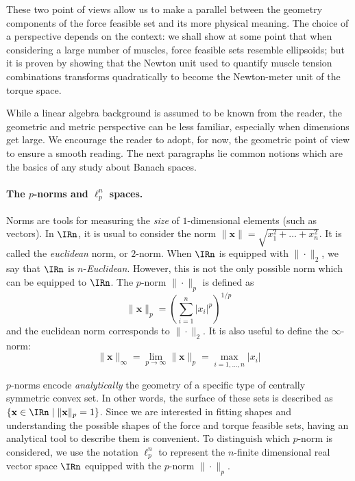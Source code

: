 These two point of views allow us to make a parallel between the geometry components of the force feasible set and its more physical meaning. The choice of a perspective depends on the context: we shall show at some point that when considering a large number of muscles, force feasible sets resemble ellipsoids; but it is proven by showing that the Newton unit used to quantify muscle tension combinations transforms quadratically to become the Newton-meter unit of the torque space.

While a linear algebra background is assumed to be known from the reader, the geometric and metric perspective can be less familiar, especially when dimensions get large. We encourage the reader to adopt, for now, the geometric point of view to ensure a smooth reading. The next paragraphs lie common notions which are the basics of any study about Banach spaces.

\paragraph*{The $p$-norms and $\ell_p^n$ spaces.} Norms are tools for measuring the \emph{size} of $1$-dimensional elements (such as vectors). In $\IRn$, it is usual to consider the norm $\|\mathbf{x}\| = \sqrt{x_1^2 + \dots + x_n^2}$. It is called the \emph{euclidean} norm, or $2$-norm. When $\IRn$ is equipped with $\|\cdot \|_2$, we say that $\IRn$ is $n$-\emph{Euclidean}. However, this is not the only possible norm which can be equipped to $\IRn$. The $p$-norm $\|\cdot \|_p$ is defined as
$$\|\mathbf{x}\|_p = \left(\sum_{i=1}^n \vert x_i \vert^{p}\right)^{1/p}$$
and the euclidean norm corresponds to $\|\cdot\|_2$. It is also useful to define the $\infty$-norm:
$$\|\mathbf{x}\|_{\infty} = \lim_{p\to \infty} \|\mathbf{x}\|_p = \max_{i=1,\dots,n}\vert x_i\vert$$

$p$-norms encode \emph{analytically} the geometry of a specific type of centrally symmetric convex set. In other words, the surface of these sets is described as $\{\mathbf{x}\in \IRn \mid \|\mathbf{x}\|_p = 1\}$. Since we are interested in fitting shapes and understanding the possible shapes of the force and torque feasible sets, having an analytical tool to describe them is convenient.
To distinguish which $p$-norm is considered, we use the notation $\ell_p^n$ to represent the $n$-finite dimensional real vector space $\IRn$ equipped with the $p$-norm $\|\cdot \|_p$. 

